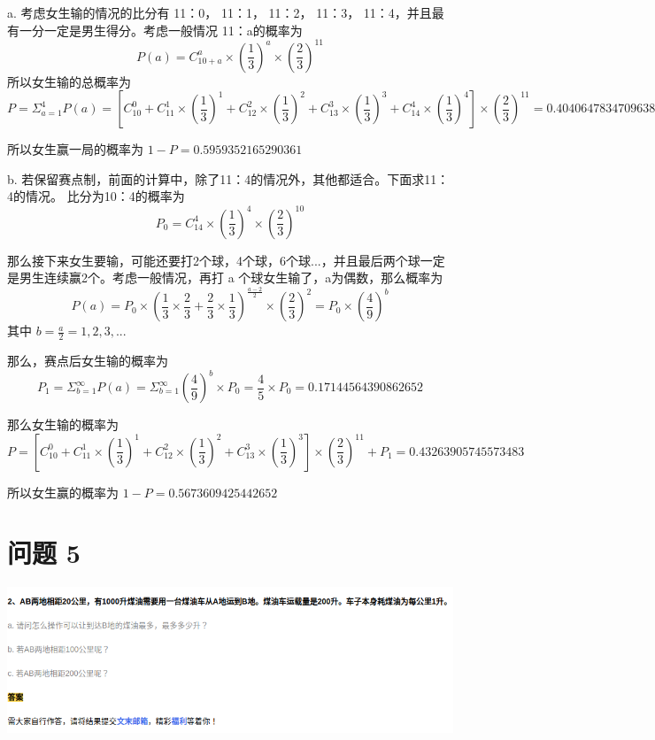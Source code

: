\documentclass{article}
\begin{document}
a. 考虑女生输的情况的比分有 11：0， 11：1， 11：2， 11：3， 11：4，并且最有一分一定是男生得分。考虑一般情况 11：a的概率为
$$
P(a) = C^a_{10+a} \times (\frac{1}{3})^a \times (\frac{2}{3})^{11}
$$
所以女生输的总概率为
$$
P = \Sigma_{a=1}^{4} P(a) = [C^0_{10} + C^1_{11} \times (\frac{1}{3})^1 + C^2_{12} \times (\frac{1}{3})^2 + C^3_{13} \times (\frac{1}{3})^3 + C^4_{14} \times (\frac{1}{3})^4] \times (\frac{2}{3})^{11} = 0.4040647834709638
$$

所以女生赢一局的概率为 $ 1 - P = 0.5959352165290361 $

\vspace{60pt}

b. 若保留赛点制，前面的计算中，除了11：4的情况外，其他都适合。下面求11：4的情况。
比分为10：4的概率为
$$
P_0 = C^4_{14} \times (\frac{1}{3})^4 \times (\frac{2}{3})^{10}
$$

那么接下来女生要输，可能还要打2个球，4个球，6个球...，并且最后两个球一定是男生连续赢2个。考虑一般情况，再打 a 个球女生输了，a为偶数，那么概率为
$$
P(a) = P_0 \times (\frac{1}{3} \times \frac{2}{3} + \frac{2}{3} \times \frac{1}{3})^{\frac{a-2}{2}} \times (\frac{2}{3})^2 = P_0 \times (\frac{4}{9})^b
$$
其中 $b=\frac{a}{2} = 1,2,3,...$

那么，赛点后女生输的概率为
$$
P_1 = \Sigma^{\infty}_{b=1} P(a) = \Sigma^{\infty}_{b=1}(\frac{4}{9})^b \times P_0 = \frac{4}{5} \times P_0 = 0.17144564390862652
$$

那么女生输的概率为
$$
P = [C^0_{10} + C^1_{11} \times (\frac{1}{3})^1 + C^2_{12} \times (\frac{1}{3})^2 + C^3_{13} \times (\frac{1}{3})^3] \times (\frac{2}{3})^{11} + P_1 = 0.43263905745573483
$$

所以女生赢的概率为 $ 1 - P = 0.5673609425442652 $

\newpage

\section{问题 5}

\includegraphics[scale=0.5]{oil.png}
\end{document}
